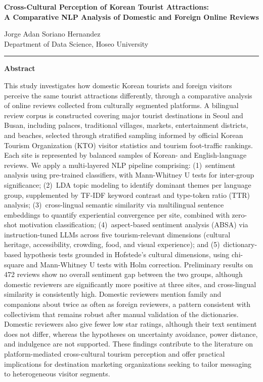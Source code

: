 \documentclass[10pt,a4paper]{article}
\begin{document}
\begin{center}
{\large\textbf{Cross-Cultural Perception of Korean Tourist Attractions:\\[3pt]
A Comparative NLP Analysis of Domestic and Foreign Online Reviews}}

\vspace{6pt}

{\normalsize Jorge Adan Soriano Hernandez}\\
{\small Department of Data Science, Hoseo University}

\end{center}

\vspace{6pt}
\noindent\rule{\linewidth}{0.4pt}
\vspace{4pt}

\noindent\textbf{Abstract}

\vspace{2pt}

\noindent
This study investigates how domestic Korean tourists and foreign visitors
perceive the same tourist attractions differently, through a comparative
analysis of online reviews collected from culturally segmented platforms.
A bilingual review corpus is constructed covering major tourist destinations
in Seoul and Busan, including palaces, traditional villages, markets,
entertainment districts, and beaches, selected through stratified sampling
informed by official Korean Tourism Organization (KTO) visitor statistics
and tourism foot-traffic rankings. Each site is represented by balanced
samples of Korean- and English-language reviews. We apply a multi-layered
NLP pipeline comprising: (1)~sentiment analysis using pre-trained classifiers,
with Mann-Whitney U tests for inter-group significance;
(2)~LDA topic modeling to identify dominant themes per language group,
supplemented by TF-IDF keyword contrast and type-token ratio (TTR) analysis;
(3)~cross-lingual semantic similarity via multilingual sentence embeddings
to quantify experiential convergence per site, combined with zero-shot
motivation classification; (4)~aspect-based sentiment analysis (ABSA)
via instruction-tuned LLMs across five tourism-relevant dimensions
(cultural heritage, accessibility, crowding, food, and visual experience);
and (5)~dictionary-based hypothesis tests grounded in Hofstede's cultural
dimensions, using chi-square and Mann-Whitney U tests with Holm correction.
Preliminary results on 472 reviews show no overall sentiment gap between the
two groups, although domestic reviewers are significantly more positive at
three sites, and cross-lingual similarity is consistently high. Domestic
reviewers mention family and companions about twice as often as foreign
reviewers, a pattern consistent with collectivism that remains robust after
manual validation of the dictionaries. Domestic reviewers also give fewer low
star ratings, although their text sentiment does not differ, whereas the hypotheses
on uncertainty avoidance, power distance, and indulgence are not supported. These findings
contribute to the literature on platform-mediated cross-cultural tourism
perception and offer practical implications for destination marketing
organizations seeking to tailor messaging to heterogeneous visitor segments.
\end{document}
